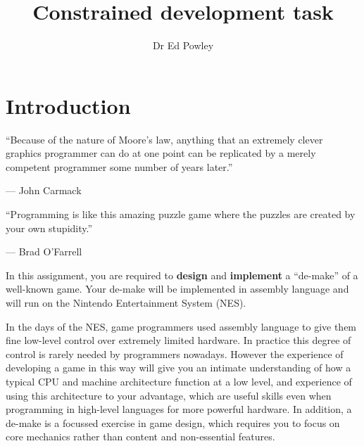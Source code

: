 \documentclass{../../fal_assignment}
\title{Constrained development task}
\author{Dr Ed Powley}
\begin{document}
\maketitle

\section*{Introduction}

\begin{marginquote}
``Because of the nature of Moore's law, anything that an extremely clever graphics programmer can do at one point can be replicated by a merely competent programmer some number of years later.''

--- John Carmack

    \marginquoterule

``Programming is like this amazing puzzle game where the puzzles are created by your own stupidity.''

--- Brad O'Farrell
\end{marginquote}

In this assignment, you are required to \textbf{design} and \textbf{implement} a ``de-make''
of a well-known game. Your de-make will be implemented in assembly language and will run on the 
Nintendo Entertainment System (NES).

In the days of the NES, game programmers used assembly language
to give them fine low-level control over extremely limited hardware.
In practice this degree of control is rarely needed by programmers nowadays.
However the experience of developing a game in this way will give you an intimate understanding
of how a typical CPU and machine architecture function at a low level,
and experience of using this architecture to your advantage,
which are useful skills even when programming in high-level languages for more powerful hardware.
In addition, a de-make is a focussed exercise in game design,
which requires you to focus on core mechanics rather than content and non-essential features.
\end{document}
